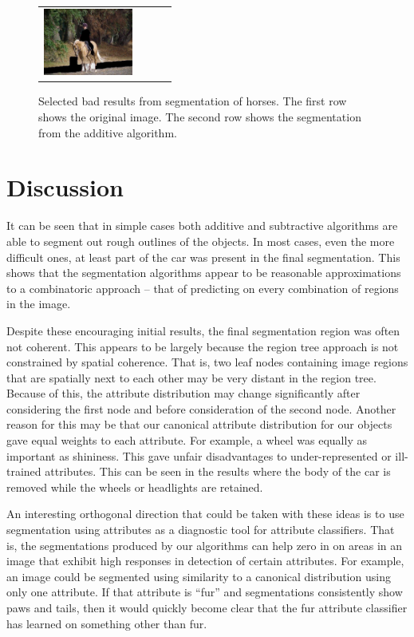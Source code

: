 \documentclass[10pt,twocolumn,letterpaper]{article}
\begin{document}
\begin{figure}[p]
\begin{tabular}{ p{3cm} p{3cm} p{3cm} p{3cm} }
\includegraphics[width=2.95cm]{figures/add_res/horse/2008_004470.jpg_3_bad.jpg.eps} \\
\end{tabular}
\caption{Selected bad results from segmentation of horses.  
The first row shows the original image.  The second row shows
the segmentation from the additive algorithm.}
\label{fig:horse_bad_results}
\end{figure}


\section{Discussion}
\label{sec:discussion}

It can be seen that in simple cases both additive and subtractive algorithms
are able to segment out rough outlines of the objects.  In most cases, even
the more difficult ones, at least part of the car was present in the final
segmentation.  This shows that the segmentation algorithms appear to be
reasonable approximations to a combinatoric approach -- that of predicting
on every combination of regions in the image.

Despite these encouraging initial results, the final segmentation region
was often not coherent.
This appears to be largely because the region tree approach is not
constrained by spatial coherence.  That is, two leaf nodes containing image
regions that are spatially next to each other may be very distant in the
region tree.  Because of this, the attribute distribution may change significantly
after considering the first node and before consideration of the second node.
Another reason for this may be that our canonical attribute distribution for
our objects gave equal weights to each attribute.  For example, a wheel was
equally as important as shininess.  This gave unfair disadvantages to
under-represented or ill-trained attributes.  This can be seen in the results
where the body of the car is removed while the wheels or headlights are
retained.

An interesting orthogonal direction that could be taken with these ideas is to
use segmentation using attributes as a diagnostic tool for attribute classifiers.
That is, the segmentations produced by our algorithms can help zero in on areas
in an image that exhibit high responses in detection of certain attributes.
For example, an image could be segmented using similarity to a canonical distribution
using only one attribute.  If that attribute is ``fur'' and segmentations
consistently show paws and tails, then it would quickly become clear that
the fur attribute classifier has learned on something other than fur.
\end{document}

